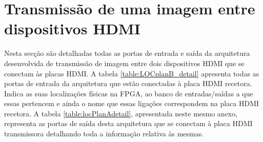 %

\section{Transmissão de uma imagem entre dispositivos HDMI} \label{ap3:imagem_RX_TX}
%
Nesta secção são detalhadas todas as portas de entrada e saída da arquitetura desenvolvida de transmissão de imagem entre dois dispositivos HDMI que se conectam às placas HDMI. 
%
A tabela \ref{table:LOCplanB_detail} apresenta todas as portas de entrada da arquitetura que estão conectadas à placa HDMI recetora. Indica as suas localizações físicas na FPGA, ao banco de entradas/saídas a que essas pertencem e ainda o nome que essas ligações correspondem na placa HDMI recetora. A tabela \ref{table:locPlanAdetail}, apresentada neste mesmo anexo, representa as portas de saída desta arquitetura que se conectam à placa HDMI transmissora detalhando toda a informação relativa às mesmas.

